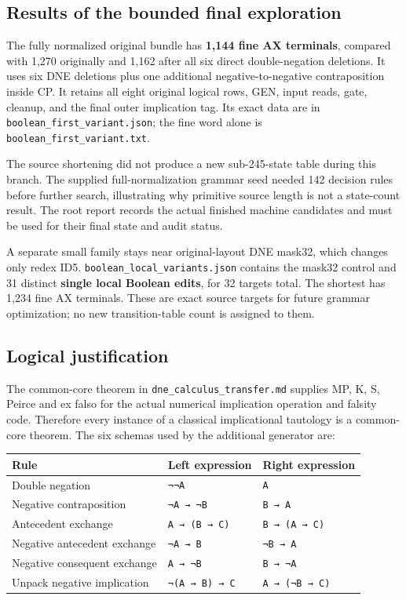 \hypertarget{results-of-the-bounded-final-exploration}{%
\subsection{Results of the bounded final
exploration}\label{results-of-the-bounded-final-exploration}}

The fully normalized original bundle has \textbf{1,144 fine AX
terminals}, compared with 1,270 originally and 1,162 after all six
direct double-negation deletions. It uses six DNE deletions plus one
additional negative-to-negative contraposition inside CP. It retains all
eight original logical rows, GEN, input reads, gate, cleanup, and the
final outer implication tag. Its exact data are in
\nolinkurl{boolean_first_variant.json}; the fine word alone is
\nolinkurl{boolean_first_variant.txt}.

The source shortening did not produce a new sub-245-state table during
this branch. The supplied full-normalization grammar seed needed 142
decision rules before further search, illustrating why primitive source
length is not a state-count result. The root report records the actual
finished machine candidates and must be used for their final state and
audit status.

A separate small family stays near original-layout DNE mask32, which
changes only redex ID5. \nolinkurl{boolean_local_variants.json} contains
the mask32 control and 31 distinct \textbf{single local Boolean edits},
for 32 targets total. The shortest has 1,234 fine AX terminals. These
are exact source targets for future grammar optimization; no new
transition-table count is assigned to them.

\hypertarget{logical-justification}{%
\subsection{Logical justification}\label{logical-justification}}

The common-core theorem in \nolinkurl{dne_calculus_transfer.md} supplies
MP, K, S, Peirce and ex falso for the actual numerical implication
operation and falsity code. Therefore every instance of a classical
implicational tautology is a common-core theorem. The six schemas used
by the additional generator are:

\begin{longtable}[]{@{}lll@{}}
\toprule\noalign{}
Rule & Left expression & Right expression \\
\midrule\noalign{}
\endhead
\bottomrule\noalign{}
\endlastfoot
Double negation & \texttt{¬¬A} & \texttt{A} \\
Negative contraposition & \texttt{¬A\ →\ ¬B} & \texttt{B\ →\ A} \\
Antecedent exchange & \texttt{A\ →\ (B\ →\ C)} &
\texttt{B\ →\ (A\ →\ C)} \\
Negative antecedent exchange & \texttt{¬A\ →\ B} & \texttt{¬B\ →\ A} \\
Negative consequent exchange & \texttt{A\ →\ ¬B} & \texttt{B\ →\ ¬A} \\
Unpack negative implication & \texttt{¬(A\ →\ B)\ →\ C} &
\texttt{A\ →\ (¬B\ →\ C)} \\
\end{longtable}

